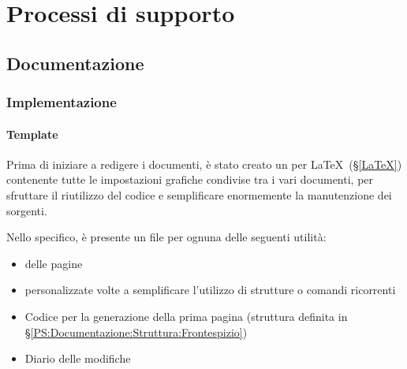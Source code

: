 
\section{Processi di supporto}\label{PS}

	\subsection{Documentazione}\label{PS:Documentazione}


		\subsubsection{Implementazione}\label{PS:Documentazione:Implementazione}

			\paragraph{Template}\label{PS:Documentazione:Implementazione:Template}
			Prima di iniziare a redigere i documenti, è stato creato un  per \LaTeX \ (\S\ref{LaTeX})
			contenente tutte le impostazioni grafiche condivise tra i vari documenti, per sfruttare il riutilizzo
			del codice e semplificare enormemente la manutenzione dei sorgenti.\par
			Nello specifico, è presente un file per ognuna delle seguenti utilità:
			\begin{itemize}
				\item {} delle pagine
				\item {} personalizzate volte a semplificare l'utilizzo di strutture o comandi ricorrenti
				\item Codice per la generazione della prima pagina
					(struttura definita in \S\ref{PS:Documentazione:Struttura:Frontespizio})
				\item Diario delle modifiche
			\end{itemize}

